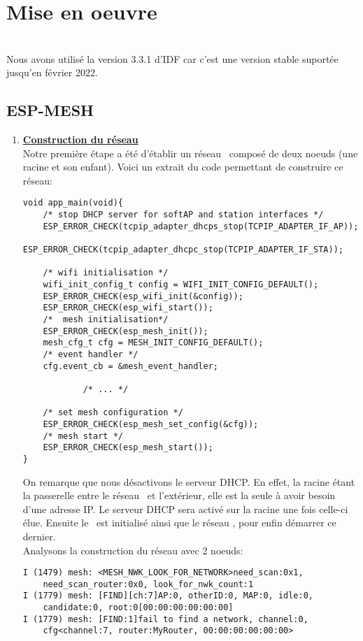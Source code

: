 \chapter{Mise en oeuvre}
    \\
    Nous avons utilisé la version 3.3.1 d'IDF car c'est une version stable suportée jusqu'en février 2022.
    \section{ESP-MESH}
    \begin{enumerate}
        \item \textbf{\underline{Construction du réseau}}\\
            Notre première étape a été d'établir un réseau \espmesh\ composé de deux noeuds (une racine et son enfant).
            Voici un extrait du code permettant de construire ce réseau:\newpage
            \begin{verbatim}
void app_main(void){
    /* stop DHCP server for softAP and station interfaces */
    ESP_ERROR_CHECK(tcpip_adapter_dhcps_stop(TCPIP_ADAPTER_IF_AP));
    ESP_ERROR_CHECK(tcpip_adapter_dhcpc_stop(TCPIP_ADAPTER_IF_STA));

    /* wifi initialisation */ 
    wifi_init_config_t config = WIFI_INIT_CONFIG_DEFAULT();
    ESP_ERROR_CHECK(esp_wifi_init(&config));
    ESP_ERROR_CHECK(esp_wifi_start());
    /*  mesh initialisation*/
    ESP_ERROR_CHECK(esp_mesh_init());
    mesh_cfg_t cfg = MESH_INIT_CONFIG_DEFAULT();
    /* event handler */
    cfg.event_cb = &mesh_event_handler;

            /* ... */
    
    /* set mesh configuration */
    ESP_ERROR_CHECK(esp_mesh_set_config(&cfg));
    /* mesh start */
    ESP_ERROR_CHECK(esp_mesh_start());
}
            \end{verbatim}
            On remarque que nous désactivons le serveur DHCP. En effet, la racine étant la passerelle entre 
            le réseau \espmesh\ et l'extérieur, elle est la seule à avoir besoin d'une adresse IP.
            Le serveur DHCP sera activé sur la racine une fois celle-ci élue.
            Ensuite le \wifi\ est initialisé ainsi que le réseau \espmesh, pour enfin démarrer ce dernier.\\
            Analysons la construction du réseau avec 2 noeuds:\\
            \begin{verbatim}
I (1479) mesh: <MESH_NWK_LOOK_FOR_NETWORK>need_scan:0x1, 
    need_scan_router:0x0, look_for_nwk_count:1
I (1779) mesh: [FIND][ch:7]AP:0, otherID:0, MAP:0, idle:0, 
    candidate:0, root:0[00:00:00:00:00:00]
I (1779) mesh: [FIND:1]fail to find a network, channel:0, 
    cfg<channel:7, router:MyRouter, 00:00:00:00:00:00>


\end{verbatim}
\end{enumerate}
